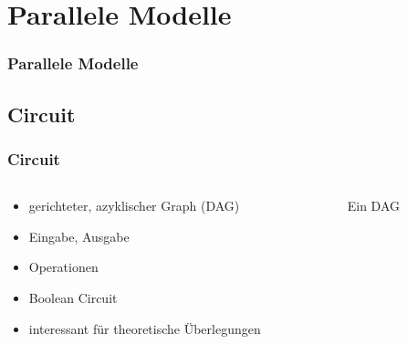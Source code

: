 \section{Parallele Modelle}

\begin{frame}
    \frametitle{Parallele Modelle}
    \tableofcontents[
        currentsection,
        hideothersubsections,
        sectionstyle=show/hide,
    ]
\end{frame}


\subsection{Circuit}
\begin{frame}
    \frametitle{Circuit}
    \begin{columns}
        \begin{column}{0.5\textwidth}
            \begin{itemize}
                \item gerichteter, azyklischer Graph (DAG)
                \item Eingabe, Ausgabe
                \item Operationen
                \item Boolean Circuit
                \item interessant für theoretische Überlegungen
            \end{itemize}
        \end{column}
        \begin{column}{0.5\textwidth}
            \begin{figure}
                \centering
                
                \caption{Ein DAG}
                \label{fig:dag}
            \end{figure}
        \end{column}
    \end{columns}
\end{frame}

